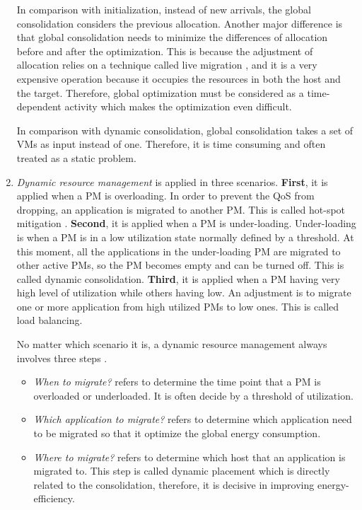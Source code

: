 \begin{enumerate}
	In comparison with initialization, instead of new arrivals, the global consolidation considers the previous allocation. Another major difference is that global consolidation needs to minimize the differences of allocation before and after the optimization. This is because the adjustment of allocation relies on a technique called live migration \cite{Clark:2005ud}, and it is a very expensive operation because it occupies the resources in both the host and the target. Therefore, global optimization must be considered as a time-dependent activity which makes the optimization even difficult.

In comparison with dynamic consolidation, global consolidation takes a set of VMs as input instead of one. Therefore, it is time consuming and often treated as a static problem.
	\item \emph{Dynamic resource management} 
 	is applied in three scenarios. \textbf{First},  it is applied when a PM is overloading. In order to prevent the QoS from dropping, an application is migrated to another PM. This is called hot-spot mitigation \cite{Mishra:2012kx}. \textbf{Second}, it is applied when a PM is under-loading. Under-loading is when a PM is in a low utilization state normally defined by a threshold. At this moment, all the applications in the under-loading PM are migrated to other active PMs, so the PM becomes empty and can be turned off. This is called dynamic consolidation. \textbf{Third}, it is applied when a PM having very high level of utilization while others having low. An adjustment is to migrate one or more application from high utilized PMs to low ones. This is called load balancing.

	No matter which scenario it is, a dynamic resource management always involves three steps . 
	\begin{itemize}
		\item \emph{When to migrate?} refers to determine the time point that a PM is overloaded or underloaded. It is often decide by a threshold of utilization.
		\item \emph{Which application to migrate?} refers to determine which application need to be migrated so that it optimize the global energy consumption.
		\item \emph{Where to migrate?} refers to determine which host that an application is migrated to. This step is called dynamic placement which is directly related to the consolidation, therefore, it is decisive in improving energy-efficiency. 
	\end{itemize}


\end{enumerate}
